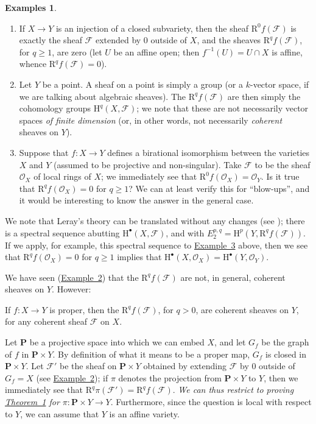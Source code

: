 \documentclass{article}
\theoremstyle{plain}
\newenvironment{theorem}[1]
    {\renewcommand\theinnertheorem{#1}\innertheorem}
    {\endinnertheorem}
\theoremstyle{definition}
\newtheorem*{examples}{Examples}
\newcommand{\scr}[1]{{\mathscr{#1}}}
\newcommand{\HH}{\mathrm{H}}
\newcommand{\RR}{\mathrm{R}}
\newcommand{\PP}{\mathbf{P}}
\renewcommand{\geq}{\geqslant}
\newcommand{\oldpage}[1]{\marginpar{\footnotesize$\Big\vert$ \textit{p.~#1}}}
\begin{document}
\begin{examples}
  \begin{enumerate}
    \item If $X\to Y$ is an injection of a closed subvariety, then the sheaf $\RR^0f(\scr{F})$ is exactly the sheaf $\scr{F}$ extended by $0$ outside of $X$, and the sheaves $\RR^qf(\scr{F})$, for $q\geq1$, are zero (let $U$ be an affine open; then $f^{-1}(U)=U\cap X$ is affine, whence $\RR^qf(\scr{F})=0$).
      \label{example1}
    \item Let $Y$ be a point.
      A sheaf on a point is simply a group (or a $k$-vector space, if we are talking about algebraic sheaves).
      The $\RR^qf(\scr{F})$ are then simply the cohomology groups $\HH^q(X,\scr{F})$;
      we note that these are not necessarily vector spaces \emph{of finite dimension} (or, in other words, not necessarily \emph{coherent} sheaves on $Y$).
        \label{example2}
    \item Suppose that $f\colon X\to Y$ defines a birational isomorphism between the varieties $X$ and $Y$ (assumed to be projective and non-singular).
      Take $\scr{F}$ to be the sheaf $\scr{O}_X$ of local rings of $X$;
      we immediately see that $\RR^0f(\scr{O}_X)=\scr{O}_Y$.
      Is it true that $\RR^qf(\scr{O}_X)=0$ for $q\geq1$?
      We can at least verify this for ``blow-ups'', and it would be interesting to know the answer in the general case.
      \label{example3}
  \end{enumerate}
\end{examples}

We note that Leray's theory can be translated without any changes (see \cite{7});
there is a spectral sequence abutting $\HH^\bullet(X,\scr{F})$, and with $E_2^{p,q}=\HH^p(Y,\RR^qf(\scr{F}))$.
If we apply, for example, this spectral sequence
\oldpage{103}
to \hyperref[example3]{Example~3} above, then we see that $\RR^qf(\scr{O}_X)=0$ for $q\geq1$ implies that $\HH^\bullet(X,\scr{O}_X)=\HH^\bullet(Y,\scr{O}_Y)$.

We have seen (\hyperref[example2]{Example~2}) that the $\RR^qf(\scr{F})$ are not, in general, coherent sheaves on $Y$.
However:

\begin{theorem}{1}
\label{theorem1}
  If $f\colon X\to Y$ is proper, then the $\RR^qf(\scr{F})$, for $q>0$, are coherent sheaves on $Y$, for any coherent sheaf $\scr{F}$ on $X$.
\end{theorem}

Let $\PP$ be a projective space into which we can embed $X$, and let $G_f$ be the graph of $f$ in $\PP\times Y$.
By definition of what it means to be a proper map, $G_f$ is closed in $\PP\times Y$.
Let $\scr{F}'$ be the sheaf on $\PP\times Y$ obtained by extending $\scr{F}$ by $0$ outside of $G_f=X$ (see \hyperref[example2]{Example~2});
if $\pi$ denotes the projection from $\PP\times Y$ to $Y$, then we immediately see that $\RR^q\pi(\scr{F}')=\RR^qf(\scr{F})$.
\emph{We can thus restrict to proving \hyperref[theorem1]{Theorem~1} for $\pi\colon \PP\times Y\to Y$}.
Furthermore, since the question is local with respect to $Y$, we can assume that $Y$ is an affine variety.
\end{document}
